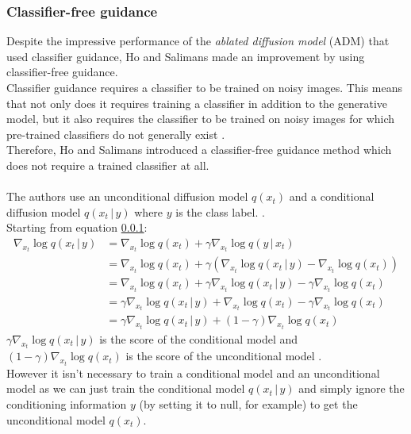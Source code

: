 \documentclass[twoside]{article}
\numberwithin{equation}{section}
\numberwithin{figure}{section}
\begin{document}
\subsubsection{Classifier-free guidance}
Despite the impressive performance of the \textit{ablated diffusion model} (ADM) that used classifier guidance, Ho and Salimans made an improvement by using classifier-free guidance. \cite{ho2022classifierfree} \\
Classifier guidance requires a classifier to be trained on noisy images. This means that not only does it requires training a classifier in addition to the generative model, but it also requires the classifier to be trained on noisy images for which pre-trained classifiers do not generally exist \cite{ho2022classifierfree}. \\
Therefore, Ho and Salimans \cite{ho2022classifierfree} introduced a classifier-free guidance method which does not require a trained classifier at all. 
\\\\
The authors use an unconditional diffusion model $q(x_t)$ and a conditional diffusion model $q(x_t \, | \, y)$ where $y$ is the class label. \cite{ho2022classifierfree, luo2022understanding}. \\
Starting from equation \ref{}:
\begin{align}
  \nabla_{x_t} \log q(x_t \, | \, y) &= \nabla_{x_t} \log q(x_t) + \gamma \nabla_{x_t} \log q(y \, | \, x_t) \\
  &= \nabla_{x_t} \log q(x_t) + \gamma \left( \nabla_{x_t} \log q (x_t \, | \, y) - \nabla_{x_t} \log q(x_t) \right) \\
  &= \nabla_{x_t} \log q(x_t) + \gamma \nabla_{x_t} \log q (x_t \, | \, y) - \gamma \nabla_{x_t} \log q(x_t) \\
  &= \gamma \nabla_{x_t} \log q (x_t \, | \, y) + \nabla_{x_t} \log q(x_t) - \gamma \nabla_{x_t} \log q(x_t) \\
  &= \gamma \nabla_{x_t} \log q (x_t \, | \, y) + (1 - \gamma) \nabla_{x_t} \log q(x_t)
\end{align}
$\gamma \nabla_{x_t} \log q (x_t \, | \, y)$ is the score of the conditional model and $(1 - \gamma) \nabla_{x_t} \log q(x_t)$ is the score of the unconditional model \cite{luo2022understanding}. \\
However it isn't necessary to train a conditional model and an unconditional model as we can just train the conditional model $q(x_t \, | \, y)$ and simply ignore the conditioning information $y$ (by setting it to null, for example) to get the unconditional model $q(x_t)$. \cite{ho2022classifierfree,luo2022understanding} \\
\newpage
\end{document}
